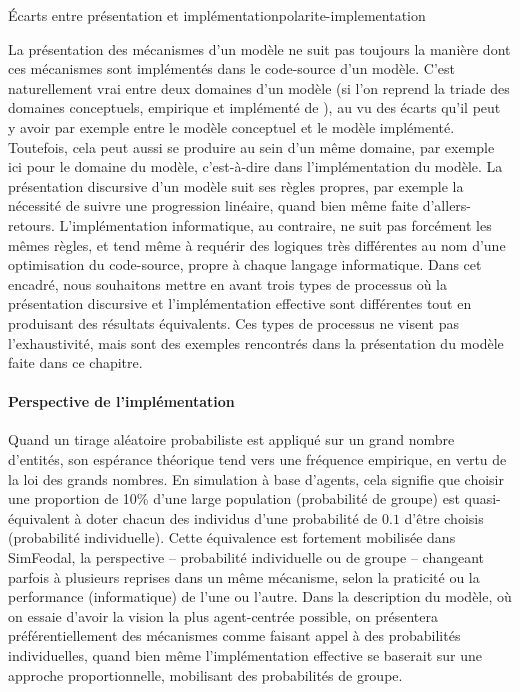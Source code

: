 \bigskip 
\begin{encadre}{Écarts entre présentation et implémentation}{polarite-implementation}
	
La présentation des mécanismes d'un modèle ne suit pas toujours la manière dont ces mécanismes sont implémentés dans le code-source d'un modèle.
C'est naturellement vrai entre deux \og domaines\fg{} d'un modèle (si l'on reprend la triade des domaines conceptuels, empirique et implémenté de \textcite{livet2014diversite}), au vu des écarts qu'il peut y avoir par exemple entre le modèle conceptuel et le modèle implémenté.
Toutefois, cela peut aussi se produire au sein d'un même domaine, par exemple ici pour le \og domaine du modèle\fg{}, c'est-à-dire dans l'implémentation du modèle.
La présentation discursive d'un modèle suit ses règles propres, par exemple la nécessité de suivre une progression linéaire, quand bien même faite d'allers-retours.
L'implémentation informatique, au contraire, ne suit pas forcément les mêmes règles, et tend même à requérir des logiques très différentes au nom d'une \og optimisation\fg{} du code-source, propre à chaque langage informatique.
Dans cet encadré, nous souhaitons mettre en avant trois types de processus où la présentation discursive et l'implémentation effective sont différentes tout en produisant des résultats équivalents.
Ces types de processus ne visent pas l'exhaustivité, mais sont des exemples rencontrés dans la présentation du modèle faite dans ce chapitre.

\paragraph{Perspective de l'implémentation} Quand un tirage aléatoire probabiliste est appliqué sur un grand nombre d'entités, son espérance théorique tend vers une fréquence empirique, en vertu de la loi des grands nombres.
En simulation à base d'agents, cela signifie que choisir une proportion de 10\% d'une large population (\og probabilité de groupe\fg{}) est quasi-équivalent à doter chacun des individus d'une probabilité de $0.1$ d'être choisis (\og probabilité individuelle\fg{}).
Cette équivalence est fortement mobilisée dans SimFeodal, la \og perspective\fg{} -- probabilité individuelle ou de groupe -- changeant parfois à plusieurs reprises dans un même mécanisme, selon la praticité ou la performance (informatique) de l'une ou l'autre.
Dans la description du modèle, où on essaie d'avoir la vision la plus \og agent-centrée\fg{} possible, on présentera préférentiellement des mécanismes comme faisant appel à des probabilités individuelles, quand bien même l'implémentation effective se baserait sur une approche proportionnelle, mobilisant des probabilités de groupe.


\end{encadre}
